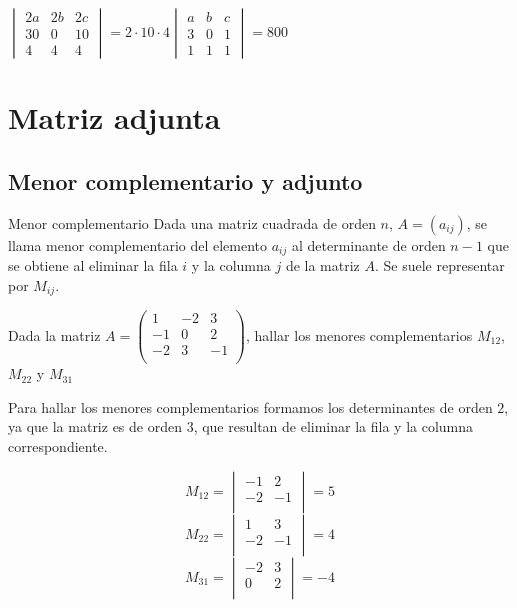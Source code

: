 \begin{ejemplo}
$
\begin{vmatrix}
  2a & 2b & 2c \\
  30 & 0 & 10 \\
 4 & 4 & 4
 \end{vmatrix} =  2\cdot 10 \cdot 4 \begin{vmatrix}
 a & b & c \\
 3 & 0 & 1 \\
 1 & 1 & 1
 \end{vmatrix} = 800  
$

\end{ejemplo}

\section{Matriz adjunta}

\subsection{Menor complementario y adjunto}


\begin{definicion}{Menor complementario}
Dada una matriz cuadrada de orden $n$, $A=(a_{ij})$, se llama menor complementario del elemento $a_{ij}$ al determinante de orden $n-1$ que se obtiene al eliminar la fila $i$ y la columna $j$ de la matriz $A$. Se suele representar por $M_{ij}$.
\end{definicion}

\begin{ejemplo}
Dada la matriz $A=\begin{pmatrix} 
1 & -2 & 3 \\
-1 & 0 & 2 \\
-2 & 3 & -1 \\
\end{pmatrix}$, hallar los menores complementarios $M_{12}$, $M_{22}$ y $M_{31}$
\tcblower

Para hallar los menores complementarios formamos los determinantes de orden $2$, ya que la matriz es de orden $3$, que resultan de eliminar la fila y la columna correspondiente.

\[ 
M_{12}=\begin{vmatrix}  -1 & 2 \\ -2 & -1 \\ \end{vmatrix}=5 \]
\[ M_{22}=\begin{vmatrix}  1 & 3 \\ -2 & -1 \\ \end{vmatrix}=4 \]
\[M_{31}=\begin{vmatrix}  -2 & 3 \\ 0 & 2 \\ \end{vmatrix}=-4
\]
\end{ejemplo}

